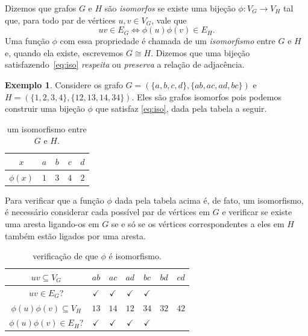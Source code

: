 \documentclass[12pt, a4paper]{article}
\theoremstyle{definition}
\newtheorem{exem}[teor]{Exemplo}
\begin{document}
\noindent Dizemos que grafos $G$ e $H$ são \emph{isomorfos} se existe uma bijeção $\phi \colon V_G \rightarrow V_H$ tal que, para todo par de vértices $u, v \in V_G$, vale que
\begin{equation}
\label{eq:iso}
    uv \in E_G \iff \phi(u)\phi(v) \in E_H.
\end{equation} 
Uma função $\phi$ com essa propriedade é chamada de um \emph{isomorfismo} entre $G$ e $H$ e, quando ela existe, escrevemos $G \cong H$. Dizemos que uma bijeção satisfazendo~\eqref{eq:iso} \emph{respeita}
  ou \emph{preserva} a relação de adjacência.
\begin{exem}
Considere os grafo $G = (\{a, b, c, d\}, \{ab, ac, ad, bc\})$ e $H = (\{1, 2, 3, 4\}, \{12, 13, 14, 34\})$. Eles são grafos isomorfos pois podemos construir uma bijeção $\phi$ que satisfaz \eqref{eq:iso}, dada pela tabela a seguir.
\begin{table}[H]
    \centering
    \begin{tabular}{c||c|c|c|c}
        $x$ & $a$ & $b$ & $c$ & $d$ \\
        \hline
        $\phi(x)$ & $1$ & $3$ & $4$ & $2$
    \end{tabular}
    \caption{um isomorfismo entre $G$ e $H$.}
    \label{tab:phi1}
\end{table}
\end{exem}
\noindent Para verificar que a função $\phi$ dada pela tabela acima é, de fato, um isomorfismo, é necessário considerar cada possível par de vértices em $G$ e verificar se existe uma aresta ligando-os em $G$ se e só se os vértices correspondentes a eles em $H$ também estão ligados por uma aresta.

\begin{table}[H]
    \centering
    \begin{tabular}{c||c|c|c|c|c|c}
         $uv \subseteq V_G$ & $ab$ & $ac$ & $ad$ & $bc$ & $bd$ & $cd$ \\
         \hline
         $uv \in E_G$? & $\checkmark$ & $\checkmark$ & $\checkmark$ & $\checkmark$ &   &   \\
         \hline
         $\phi(u)\phi(v) \subseteq V_H$ & $13$ & $14$ & $12$ & $34$ & $32$ & $42$ \\
         \hline
         $\phi(u)\phi(v) \in E_H$? & $\checkmark$ & $\checkmark$ & $\checkmark$ & $\checkmark$ &   &   
    \end{tabular}
    \caption{verificação de que $\phi$ é isomorfismo.}
    \label{tab:verif}
\end{table}
\end{document}
